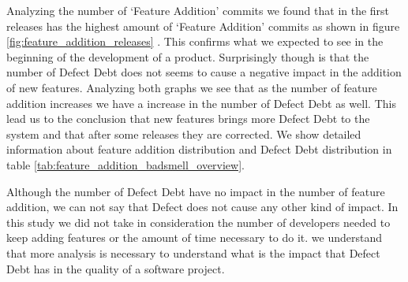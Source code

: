 Analyzing the number of `Feature Addition' commits we found that in the first releases has the highest amount of `Feature Addition' commits as shown in figure \ref{fig:feature_addition_releases} . This confirms what we expected to see in the beginning of the development of a product. Surprisingly though is that the number of Defect Debt does not seems to cause a negative impact in the addition of new features. Analyzing both graphs we see that as the number of feature addition increases we have a increase in the number of Defect Debt as well. This lead us to the conclusion that new features brings more Defect Debt to the system and that after some releases they are corrected. We show detailed information about feature addition distribution and Defect Debt distribution in table \ref{tab:feature_addition_badsmell_overview}. 

Although the number of Defect Debt have no impact in the number of feature addition, we can not say that Defect does not cause any other kind of impact. In this study we did not take in consideration the number of developers needed to keep adding features or the amount of time necessary to do it. we understand that more analysis is necessary to understand what is the impact that Defect Debt has in the quality of a software project.

\vspace{1mm}
\vspace{1mm}

